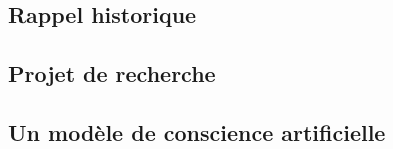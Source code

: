\subsection{Rappel historique}


\subsection{Projet de recherche}


\subsection{Un modèle de conscience artificielle}
